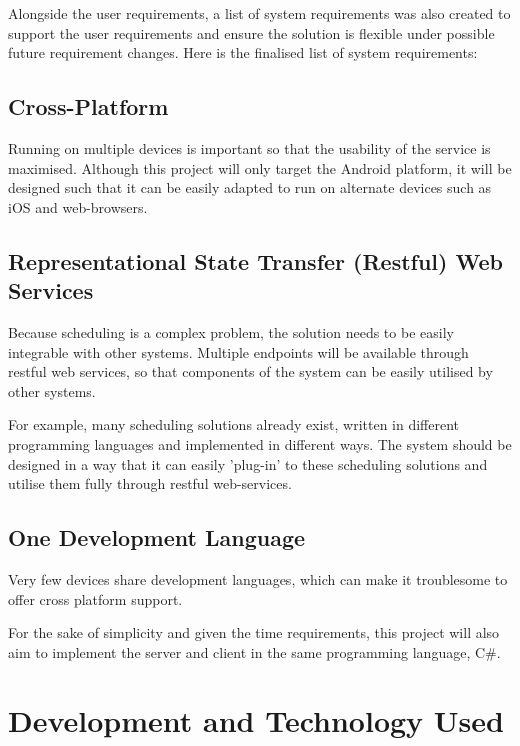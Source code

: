 Alongside the user requirements, a list of system requirements was also created to support the user requirements and ensure the solution is flexible under possible future requirement changes. Here is the finalised list of system requirements:

\subsection{Cross-Platform}

Running on multiple devices is important so that the usability of the service is maximised. Although this project will only target the Android platform, it will be designed such that it can be easily adapted to run on alternate devices such as iOS and web-browsers.

\subsection{Representational State Transfer (Restful) Web Services}

Because scheduling is a complex problem, the solution needs to be easily integrable with other systems. Multiple endpoints will be available through restful web services, so that components of the system can be easily utilised by other systems. 

For example, many scheduling solutions already exist, written in different programming languages and implemented in different ways. The system should be designed in a way that it can easily 'plug-in' to these scheduling solutions and utilise them fully through restful web-services.

\subsection{One Development Language}

Very few devices share development languages, which can make it troublesome to offer cross platform support.

For the sake of simplicity and given the time requirements, this project will also aim to implement the server and client in the same programming language, C\#.


\section{Development and Technology Used}

